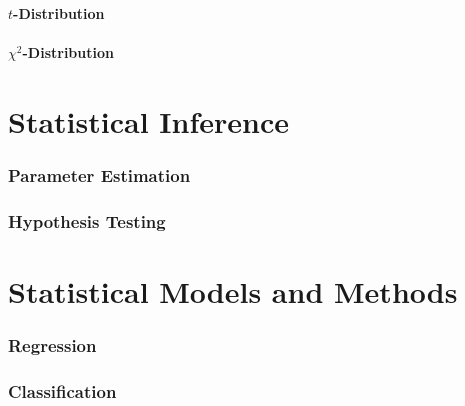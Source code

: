 \documentclass{article}
\begin{document}
\subsection{$t$-Distribution}
\subsection{$\chi^2$-Distribution}

\newpage
\part{Statistical Inference}
\section{Parameter Estimation}
\section{Hypothesis Testing}

\newpage
\part{Statistical Models and Methods}
\section{Regression}
\section{Classification}

    
\end{document}
